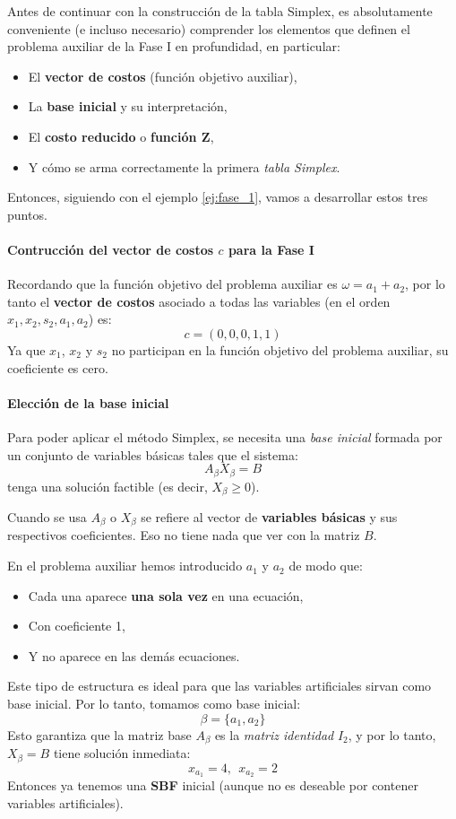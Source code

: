 Antes de continuar con la construcción de la tabla Simplex, es absolutamente conveniente (e incluso necesario) comprender los elementos que definen el problema auxiliar de la Fase I en profundidad, en particular:
\begin{itemize}
  \item El \textbf{vector de costos} (función objetivo auxiliar),
  \item La \textbf{base inicial} y su interpretación,
  \item El \textbf{costo reducido} o \textbf{función Z},
  \item Y cómo se arma correctamente la primera \textit{tabla Simplex}.
\end{itemize}

Entonces, siguiendo con el ejemplo \ref{ej:fase_1}, vamos a desarrollar estos tres puntos.

\paragraph{Contrucción del vector de costos \(c\) para la Fase I}

Recordando que la función objetivo del problema auxiliar es \(\omega = a_1 + a_2\), por lo tanto el \textbf{vector de costos} asociado a todas las variables (en el orden \(x_1, x_2, s_2, a_1, a_2\)) es: 
\[c = (0, 0, 0, 1, 1)\]
Ya que \(x_1\), \(x_2\) y \(s_2\) no participan en la función objetivo del problema auxiliar, su coeficiente es cero.

\paragraph{Elección de la base inicial}

Para poder aplicar el método Simplex, se necesita una \textit{base inicial} formada por un conjunto de variables básicas tales que el sistema:
\[
A_{\beta}X_{\beta} = B
\]
tenga una solución factible (es decir, \(X_\beta \geq 0\)).
\begin{tcolorbox}[remember, title=Aclaración]
  Cuando se usa \(A_\beta\) o \(X_\beta\) se refiere al vector de \textbf{variables básicas} y sus respectivos coeficientes. Eso no tiene nada que ver con la matriz \(B\).
\end{tcolorbox}

En el problema auxiliar hemos introducido \(a_1\) y \(a_2\) de modo que:
\begin{itemize}
  \item Cada una aparece \textbf{una sola vez} en una ecuación,
  \item Con coeficiente 1,
  \item Y no aparece en las demás ecuaciones.
\end{itemize}
Este tipo de estructura es ideal para que las variables artificiales sirvan como base inicial. Por lo tanto, tomamos como base inicial:
\[
  \beta = \{a_1, a_2\}
\]
Esto garantiza que la matriz base \(A_\beta\) es la \textit{matriz identidad} \(I_2\), y por lo tanto, \(X_\beta = B\) tiene solución inmediata:
\[
  x_{a_1} = 4, ~~ x_{a_2} = 2
\]
Entonces ya tenemos una \textbf{SBF} inicial (aunque no es deseable por contener variables artificiales).

